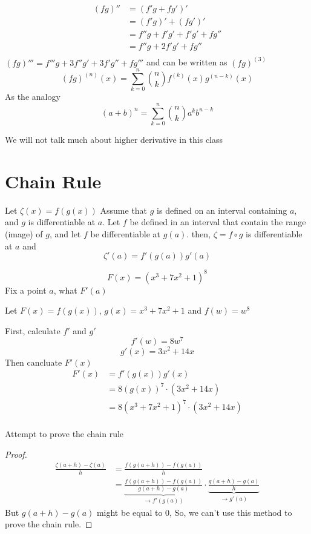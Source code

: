 \begin{example*}
  \begin{align*}
    (fg)'' &= (f'g + fg')' \\
    &= (f'g)' + (fg')' \\
    &= f''g + f'g' + f'g' + fg'' \\
    &= f''g + 2f'g' + fg'' \\
  \end{align*}
  $(fg)''' = f'''g + 3f''g' + 3f'g'' + fg'''$
  and can be written as $(fg)^{(3)}$
  $$(fg)^{(n)}(x) = \sum_{k=0}^n \binom{n}{k} f^{(k)}(x)g^{(n-k)}(x)$$
  As the analogy
  $$(a + b)^n = \sum_{k=0}^n \binom{n}{k} a^k b^{n-k}$$
\end{example*}

We will not talk much about higher derivative in this class

\section{Chain Rule}

Let $\zeta(x) = f(g(x))$
Assume that $g$ is defined on an interval containing $a$, and $g$ is differentiable at \underline{$a$}.
Let $f$ be defined in an interval that contain the range (image) of $g$, and let $f$ be differentiable at $g(a)$.
then, $\zeta = f \circ g$ is differentiable at $a$ and $$\zeta'(a) = f'(g(a))g'(a)$$


\begin{example*}
  $$F(x) = (x^3 + 7x^2 + 1)^8$$
  Fix a point $a$, what $F'(a)$
  
  
  Let $F(x) = f(g(x))$, $g(x) = x^3 + 7x^2 + 1$ and $f(w) = w^8$

  First, calculate $f'$ and $g'$
  $$f'(w) = 8w^7$$ 
  $$g'(x) = 3x^2 + 14x$$
  Then cancluate $F'(x)$
  \begin{align*}
  F'(x) &= f'(g(x))g'(x) \\
  &= 8(g(x))^7 \cdot (3x^2 + 14x) \\
  &= 8(x^3 + 7x^2 + 1)^7 \cdot (3x^2 + 14x) \\
  \end{align*}
\end{example*}

Attempt to prove the chain rule

\begin{proof}
  \begin{align*}
    \frac{\zeta(a+h) - \zeta(a)}{h} &= \frac{f(g(a+h)) - f(g(a))}{h} \\
    &= \underbrace{\frac{f(g(a+h)) - f(g(a))}{g(a+h) - g(a)}}_{\to f'(g(a))} \cdot \underbrace{\frac{g(a+h) - g(a)}{h}}_{\to g'(a)}
  \end{align*}
  But $g(a+h) - g(a)$ might be equal to $0$, So, we can't use this method to prove the chain rule.
\end{proof}

